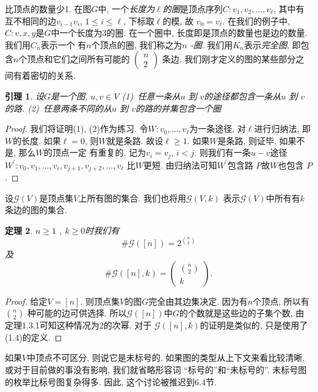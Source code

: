 \documentclass{ctexbook}
\newtheorem{thm}{定理}[section]
\newtheorem{lem}[thm]{引理}
\begin{document}
\noindent
比顶点的数量少1. 在图$G$中, 一个\textsl{长度为$\ell$的圈}是顶点序列$C: v_{1}, v_{2}, \ldots, v_{\ell}$,
其中有互不相同的边$v_{i-1} v_{i}$, $1 \leqslant i \leqslant \ell$, 下标取$\ell$的模, 故 $v_{0}=v_{\ell}$.
在我们的例子中,  $C: v, x, y$是$G$中一个长度为3的圈. 在一个圈中, 长度即是顶点的数量也是边的数量. 我们用$C_{n}$表示一个
有$n$个顶点的圈, 我们称之为\textsl{$n$ -圈}. 我们用$K_{n}$表示\textsl{完全图}, 即包含$n$个顶点和它们之间所有可能的
$\left(\begin{array}{l}n \\ 2\end{array}\right)$ 条边. 我们刚才定义的图的某些部分之间有着密切的关系.
   \begin{lem}
   	设$G$是一个图,  $u, v \in V$
   	(1)\ 任意一条从$u$ 到 $v$的途径都包含一条从$u$ 到 $v$的路.
    (2)\ 任意两条不同的从$u$ 到 $v$的路的并集包含一个圈
   \end{lem}
     \begin{proof}
    	我们将证明(1), (2)作为练习. 令$W: v_{0}, \ldots, v_{\ell}$为一条途径, 对$\ell$进行归纳法,
    	即$W$的长度. 如果$\ell=0$, 则$W$就是条路. 故设$\ell \geqslant 1$. 如果$W$是条路, 则证毕. 如果不是, 那么$W$的顶点一定
    	有重复的, 记为$v_{i}=v_{j}$, $i<j$. 则我们有一条$u-v$途径$W^{\prime}: v_{0}, v_{1}, \ldots, v_{i}, v_{j+1}, v_{j+2}, \ldots, v_{\ell}$
    	比$W$更短. 由归纳法可知$W^{\prime}$包含路 $P$故$W$也包含 $P$.
    \end{proof}
设$\mathcal{G}(V)$是顶点集$V$上所有图的集合. 我们也将用$\mathcal{G}(V, k)$ 表示$\mathcal{G}(V)$中所有有$k$条边的图的集合.
      \begin{thm}
     	$n \geqslant 1$ ,  $k \geqslant 0$时我们有
     	$$
     	\# \mathcal{G}([n])=2^{\binom{n}{2}}
     	$$
     	及
     	$$
     	\# \mathcal{G}([n], k)=\left(\begin{array}{c}
     	\binom{n}{2} \\ k
     	\end{array}\right).
     	$$
     \end{thm}
     \begin{proof}
     	给定$V=[n]$, 则顶点集$V$的图$G$完全由其边集决定. 因为有$n$个顶点, 所以有$\binom{n}{2}$
     	种可能的边可供选择. 所以$\mathcal{G}([n])$中$G$的个数就是这些边的子集个数, 由定理1.3.1可知这种情况为2的次幂. 对于
     	$\mathcal{G}([n], k)$的证明是类似的, 只是使用了(1.4)的定义.
     \end{proof}

如果$V$中顶点不可区分, 则说它是未标号的. 如果图的类型从上下文来看比较清晰, 或对于目前做的事没有影响, 我们就省略形容词
“标号的”和“未标号的”. 未标号图的枚举比标号图复杂得多. 因此, 这个讨论被推迟到6.4节.
\end{document}
